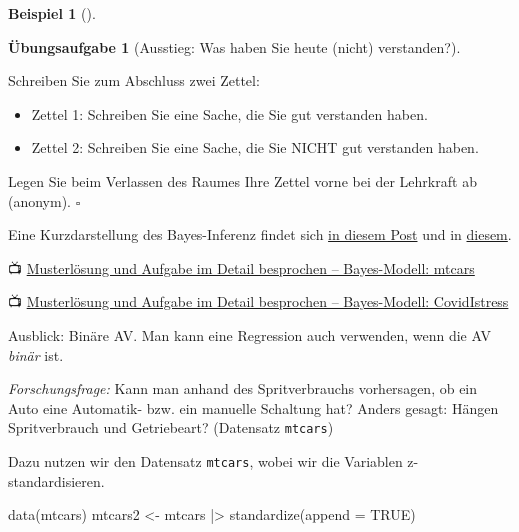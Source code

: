\documentclass[
  ngerman,
  letterpaper,
  twoside,
  open=any]{scrbook}
\newenvironment{Shaded}{\begin{snugshade}}{\end{snugshade}}
\newcommand{\AttributeTok}[1]{\textcolor[rgb]{0.40,0.45,0.13}{#1}}
\newcommand{\ConstantTok}[1]{\textcolor[rgb]{0.56,0.35,0.01}{#1}}
\newcommand{\FunctionTok}[1]{\textcolor[rgb]{0.28,0.35,0.67}{#1}}
\newcommand{\NormalTok}[1]{\textcolor[rgb]{0.00,0.23,0.31}{#1}}
\newcommand{\OtherTok}[1]{\textcolor[rgb]{0.00,0.23,0.31}{#1}}
\newcommand{\SpecialCharTok}[1]{\textcolor[rgb]{0.37,0.37,0.37}{#1}}
\providecommand{\tightlist}{%
  \setlength{\itemsep}{0pt}\setlength{\parskip}{0pt}}\usepackage{longtable,booktabs,array}
\theoremstyle{definition}
\newtheorem{example}{Beispiel}[chapter]
\theoremstyle{plain}
\theoremstyle{definition}
\newtheorem{exercise}{Übungsaufgabe}[chapter]
\theoremstyle{definition}
\theoremstyle{remark}
\begin{document}
\begin{example}[]
\begin{exercise}[Ausstieg: Was haben Sie heute (nicht)
verstanden?]\protect\hypertarget{exr-ausstieg-fallbsps}{}\label{exr-ausstieg-fallbsps}

Schreiben Sie zum Abschluss zwei Zettel:

\begin{itemize}
\tightlist
\item
  Zettel 1: Schreiben Sie eine Sache, die Sie gut verstanden haben.
\item
  Zettel 2: Schreiben Sie eine Sache, die Sie NICHT gut verstanden
  haben.
\end{itemize}

Legen Sie beim Verlassen des Raumes Ihre Zettel vorne bei der Lehrkraft
ab (anonym). \(\square\)

\end{exercise}

Eine Kurzdarstellung des Bayes-Inferenz findet sich
\href{https://sebastiansauer.github.io/data_se/2022/01/27/bayes-in-f\%C3\%BCnf-minuten/}{in
diesem Post} und in
\href{https://sebastiansauer.github.io/data_se/2022/01/28/bayes-in-f\%C3\%BCnf-minuten-f\%C3\%BCr-fortgeschrittene/}{diesem}.

📺 \href{https://www.youtube.com/watch?v=Yoo8IcmwRWg}{Musterlösung und
Aufgabe im Detail besprochen -- Bayes-Modell: mtcars}

📺 \href{https://www.youtube.com/watch?v=5A5bDNeB6sA}{Musterlösung und
Aufgabe im Detail besprochen -- Bayes-Modell: CovidIstress}

Ausblick: Binäre AV. Man kann eine Regression auch verwenden, wenn die
AV \emph{binär} ist.

\begin{displayquote}
\emph{Forschungsfrage:} Kann man anhand des Spritverbrauchs vorhersagen,
ob ein Auto eine Automatik- bzw. ein manuelle Schaltung hat? Anders
gesagt: Hängen Spritverbrauch und Getriebeart? (Datensatz
\texttt{mtcars})
\end{displayquote}

Dazu nutzen wir den Datensatz \texttt{mtcars}, wobei wir die Variablen
z-standardisieren.

\begin{Shaded}
\begin{Highlighting}[]
\FunctionTok{data}\NormalTok{(mtcars)}
\NormalTok{mtcars2 }\OtherTok{\textless{}{-}}
\NormalTok{  mtcars }\SpecialCharTok{|\textgreater{}} 
  \FunctionTok{standardize}\NormalTok{(}\AttributeTok{append =} \ConstantTok{TRUE}\NormalTok{)}
\end{Highlighting}
\end{Shaded}


\end{example}
\end{document}
